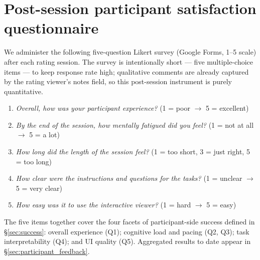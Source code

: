 \section{Post-session participant satisfaction questionnaire}
\label{app:satisfaction}

We administer the following five-question Likert survey (Google Forms,
1--5 scale) after each rating session. The survey is intentionally
short --- five multiple-choice items --- to keep response rate high;
qualitative comments are already captured by the rating viewer's
notes field, so this post-session instrument is purely quantitative.

\begin{enumerate}
    \item \textit{Overall, how was your participant experience?}
    \quad(1 = poor $\rightarrow$ 5 = excellent)
    \item \textit{By the end of the session, how mentally fatigued
    did you feel?} \quad(1 = not at all $\rightarrow$ 5 = a lot)
    \item \textit{How long did the length of the session feel?}
    \quad(1 = too short, 3 = just right, 5 = too long)
    \item \textit{How clear were the instructions and questions for
    the tasks?} \quad(1 = unclear $\rightarrow$ 5 = very clear)
    \item \textit{How easy was it to use the interactive viewer?}
    \quad(1 = hard $\rightarrow$ 5 = easy)
\end{enumerate}

The five items together cover the four facets of participant-side
success defined in \S\ref{sec:success}: overall experience (Q1);
cognitive load and pacing (Q2, Q3); task interpretability (Q4); and
UI quality (Q5). Aggregated results to date appear in
\S\ref{sec:participant_feedback}.
